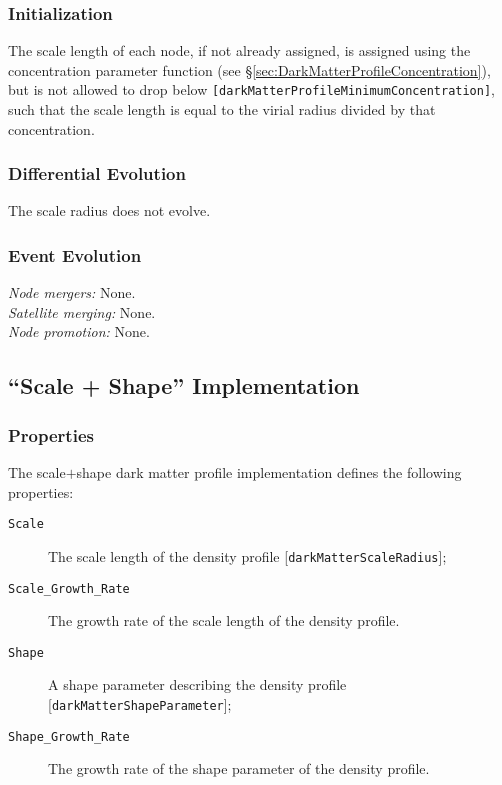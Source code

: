 \subsubsection{Initialization}

The scale length of each node, if not already assigned, is assigned using the concentration parameter function (see \S\ref{sec:DarkMatterProfileConcentration}), but is not allowed to drop below {\tt [darkMatterProfileMinimumConcentration]}, such that the scale length is equal to the virial radius divided by that concentration.

\subsubsection{Differential Evolution}

The scale radius does not evolve.

\subsubsection{Event Evolution}

\noindent\emph{Node mergers:} None.\\

\noindent\emph{Satellite merging:} None.\\

\noindent\emph{Node promotion:} None.\\

\subsection{``Scale + Shape'' Implementation}

\subsubsection{Properties}

The scale$+$shape dark matter profile implementation defines the following properties:
\begin{description}
 \item [{\tt Scale}] The scale length of the density profile [{\tt darkMatterScaleRadius}];
 \item [{\tt Scale\_Growth\_Rate}] The growth rate of the scale length of the density profile.
 \item [{\tt Shape}] A shape parameter describing the density profile [{\tt darkMatterShapeParameter}];
 \item [{\tt Shape\_Growth\_Rate}] The growth rate of the shape parameter of the density profile.
\end{description}

